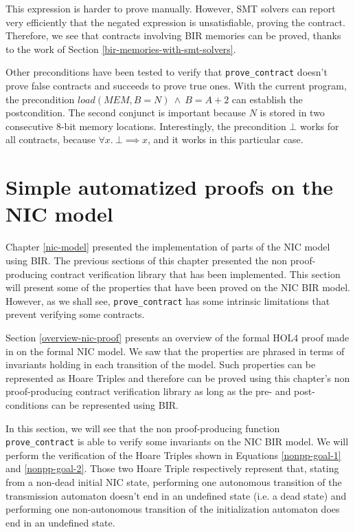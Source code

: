 \documentclass{kththesis}
\begin{document}
{This expression is harder to prove manually. However, SMT solvers can report very efficiently that the negated expression is unsatisfiable, proving the contract. Therefore, we see that contracts involving BIR memories can be proved, thanks to the work of Section \ref{bir-memories-with-smt-solvers}.

Other preconditions have been tested to verify that \texttt{prove\_contract} doesn't prove false contracts and succeeds to prove true ones. With the current program, the precondition $load(MEM,B=N)~\land~B=A+2$ can establish the postcondition. The second conjunct is important because $N$ is stored in two consecutive 8-bit memory locations. Interestingly, the precondition $\bot$ works for all contracts, because $\forall x.~\bot \implies x$, and it works in this particular case.


\section{Simple automatized proofs on the NIC model} \label{simple-automated-proofs-on-nic}

Chapter \ref{nic-model} presented the implementation of parts of the NIC model using BIR. The previous sections of this chapter presented the non \gls{proof-producing} contract verification library that has been implemented. This section will present some of the properties that have been proved on the NIC BIR model. However, as we shall see, \texttt{prove\_contract} has some intrinsic limitations that prevent verifying some contracts.

Section \ref{overview-nic-proof} presents an overview of the formal HOL4 proof made in \cite{haglund_formal_2016} on the formal NIC model. We saw that the properties are phrased in terms of invariants holding in each transition of the model. Such properties can be represented as Hoare Triples and therefore can be proved using this chapter's non proof-producing contract verification library as long as the pre- and post-conditions can be represented using BIR.

In this section, we will see that the non proof-producing function \texttt{prove\_contract} is able to verify some invariants on the NIC BIR model. We will perform the verification of the Hoare Triples shown in Equations \ref{nonpp-goal-1} and \ref{nonpp-goal-2}. Those two Hoare Triple respectively represent that, stating from a non-dead initial NIC state, performing one autonomous transition of the transmission automaton doesn't end in an undefined state (i.e. a dead state) and performing one non-autonomous transition of the initialization automaton does end in an undefined state.

}
\end{document}
